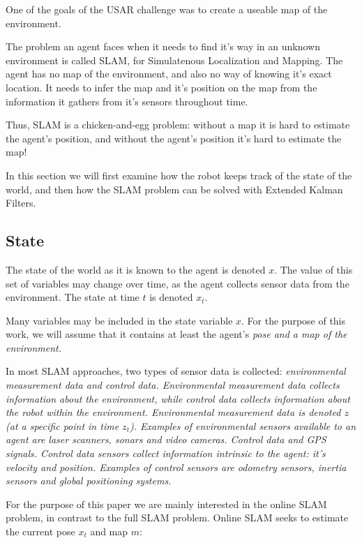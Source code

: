 
One of the goals of the USAR challenge was to create a useable map of the environment. 

The problem an agent faces when it needs to find it's way in an unknown environment is called SLAM, for Simulatenous Localization and Mapping. The agent has no map of the environment, and also no way of knowing it's exact location. It needs to infer the map and it's position on the map from the information it gathers from it's sensors throughout time.

Thus, SLAM is a chicken-and-egg problem: without a map it is hard to estimate the agent's position, and without the agent's position it's hard to estimate the map!

In this section we will first examine how the robot keeps track of the state of the world, and then how the SLAM problem can be solved with Extended Kalman Filters. 

\subsection{State}
The state of the world as it is known to the agent is denoted $x$. The value of this set of variables may change over time, as the agent collects sensor data from the environment. The state at time $t$ is denoted $x_{t}$. 

Many variables may be included in the state variable $x$. For the purpose of this work, we will assume that it contains at least the agent's \em{pose} and a \em{map of the environment}. 

In most SLAM approaches, two types of sensor data is collected: \em{environmental measurement data} and \em{control data}. Environmental measurement data collects information about the environment, while control data collects information about the robot within the environment. Environmental measurement data  is denoted $z$ (at a specific point in time $z_{t}$). Examples of environmental sensors available to an agent are laser scanners, sonars and video cameras. Control data and GPS signals. Control data sensors collect information intrinsic to the agent: it's velocity and position. Examples of control sensors are odometry sensors, inertia sensors and global positioning systems.

For the purpose of this paper we are mainly interested in the online SLAM problem, in contrast to the full SLAM problem. Online SLAM seeks to estimate the current pose $x_{t}$ and map $m$:

